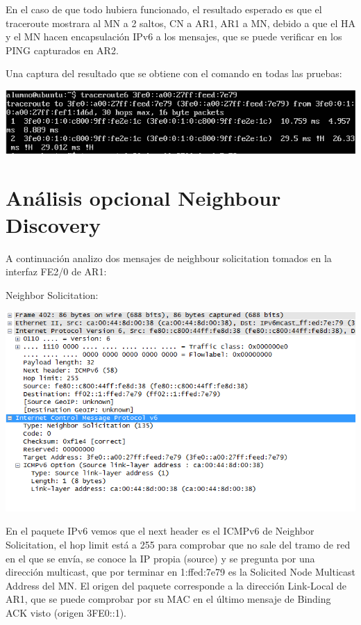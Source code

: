 \documentclass{article}
\begin{document}
En el caso de que todo hubiera funcionado, el resultado esperado es que el traceroute mostrara al MN a 2 saltos, CN a AR1, AR1 a MN, debido a que el HA y el MN hacen encapsulación IPv6 a los mensajes, que se puede verificar en los PING capturados en AR2.

Una captura del resultado que se obtiene con el comando en todas las pruebas:


\begin{center}
	\includegraphics[scale=0.6]{images/trac6.png}
\end{center}



\section{Análisis opcional Neighbour Discovery}
A continuación analizo dos mensajes de neighbour solicitation tomados en la interfaz FE2/0 de AR1:

Neighbor Solicitation:

\begin{center}
	\includegraphics[scale=0.8]{images/neighSol.PNG}
\end{center}

En el paquete IPv6 vemos que el next header es el ICMPv6 de Neighbor Solicitation, el hop limit está a 255 para comprobar que no sale del tramo de red en el que se envía, se conoce la IP propia (source) y se pregunta por una dirección multicast, que por terminar en 1:ffed:7e79 es la Solicited Node Multicast Address del MN. El origen del paquete corresponde a la dirección Link-Local de AR1, que se puede comprobar por su MAC en el último mensaje de Binding ACK visto (origen 3FE0::1).
\end{document}
